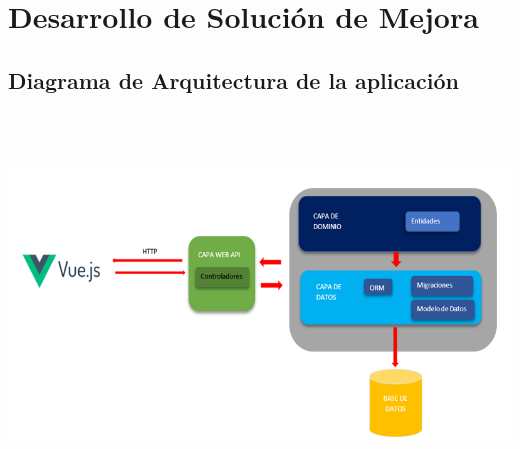 \documentclass[12pt,letterpaper]{article}
\begin{document}
\section{ Desarrollo de Solución de Mejora}    
\subsection{Diagrama de Arquitectura de la aplicación}
\begin{center}
    \includegraphics[width=18cm, height=10cm]{img/arqui.png}  
\end{center}
\end{document}
